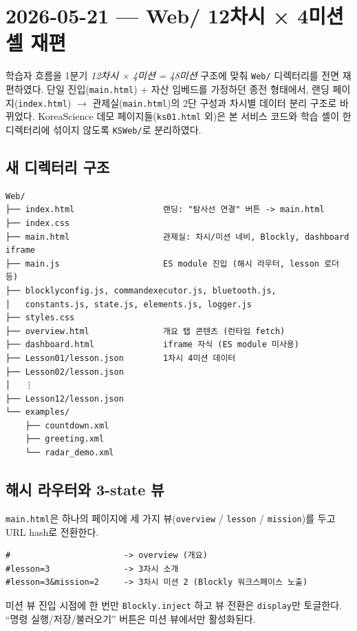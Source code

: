 \documentclass[11pt, oneside]{article}
\begin{document}
\section{2026-05-21 --- Web/ 12차시 × 4미션 셸 재편}

학습자 흐름을 1분기 \emph{12차시 × 4미션 = 48미션} 구조에 맞춰
\texttt{Web/} 디렉터리를 전면 재편하였다. 단일 진입(\texttt{main.html})
+ 자산 임베드를 가정하던 종전 형태에서, 랜딩 페이지(\texttt{index.html})
$\to$ 관제실(\texttt{main.html})의 2단 구성과 차시별 데이터 분리 구조로
바뀌었다. KoreaScience 데모 페이지들(\texttt{ks01.html} 외)은 본
서비스 코드와 학습 셸이 한 디렉터리에 섞이지 않도록 \texttt{KSWeb/}로
분리하였다.

\subsection{새 디렉터리 구조}

\begin{verbatim}
Web/
├── index.html                  랜딩: "탐사선 연결" 버튼 -> main.html
├── index.css
├── main.html                   관제실: 차시/미션 네비, Blockly, dashboard iframe
├── main.js                     ES module 진입 (해시 라우터, lesson 로더 등)
├── blocklyconfig.js, commandexecutor.js, bluetooth.js,
│   constants.js, state.js, elements.js, logger.js
├── styles.css
├── overview.html               개요 탭 콘텐츠 (런타임 fetch)
├── dashboard.html              iframe 자식 (ES module 미사용)
├── Lesson01/lesson.json        1차시 4미션 데이터
├── Lesson02/lesson.json
│   ⋮
├── Lesson12/lesson.json
└── examples/
    ├── countdown.xml
    ├── greeting.xml
    └── radar_demo.xml
\end{verbatim}

\subsection{해시 라우터와 3-state 뷰}

\texttt{main.html}은 하나의 페이지에 세 가지 뷰(\texttt{overview} /
\texttt{lesson} / \texttt{mission})를 두고 URL hash로 전환한다.

\begin{verbatim}
#                       -> overview (개요)
#lesson=3               -> 3차시 소개
#lesson=3&mission=2     -> 3차시 미션 2 (Blockly 워크스페이스 노출)
\end{verbatim}

미션 뷰 진입 시점에 한 번만 \texttt{Blockly.inject} 하고 뷰 전환은
\texttt{display}만 토글한다. ``명령 실행/저장/불러오기'' 버튼은 미션
뷰에서만 활성화된다.
\end{document}
